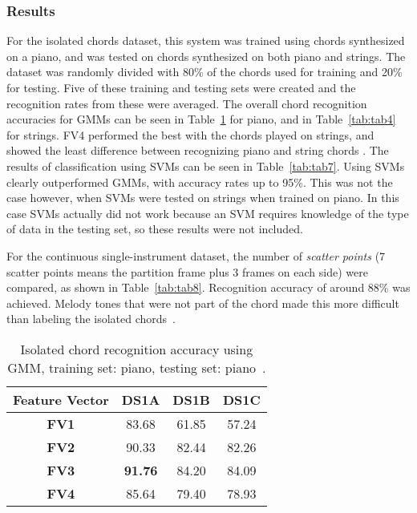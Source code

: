 \documentclass{sig-alternate}
\begin{document}
\subsubsection{Results}

For the isolated chords dataset, this system was trained using chords synthesized on a piano, and was tested on chords synthesized on both piano and strings. The dataset was randomly divided with 80\% of the chords used for training and 20\% for testing. Five of these training and testing sets were created and the recognition rates from these were averaged. The overall chord recognition accuracies for GMMs can be seen in Table~\ref{tab:tab3} for piano, and in Table~\ref{tab:tab4} for strings. FV4 performed the best with the chords played on strings, and showed the least difference between recognizing piano and string chords \cite{Morman:2006}. The results of classification using SVMs can be seen in Table~\ref{tab:tab7}. Using SVMs clearly outperformed GMMs, with accuracy rates up to 95\%. This was not the case however, when SVMs were tested on strings when trained on piano. In this case SVMs actually did not work because an SVM requires knowledge of the type of data in the testing set, so these results were not included.  

For the continuous single-instrument dataset, the number of \textit{scatter points} (7 scatter points means the partition frame plus 3 frames on each side) were compared, as shown in Table~\ref{tab:tab8}. Recognition accuracy of around 88\% was achieved. Melody tones that were not part of the chord made this more difficult than labeling the isolated chords~\cite{Morman:2006}. 



\begin{table}
\centering
\begin{tabular}{|c|c|c|c|} \hline
\textbf{Feature Vector} & \textbf{DS1A} & \textbf{DS1B} & \textbf{DS1C} \\ \hline
\textbf{FV1} & 83.68 & 61.85 & 57.24 \\ \hline
\textbf{FV2} & 90.33 & 82.44 & 82.26 \\ \hline
\textbf{FV3} & \textbf{91.76} & 84.20 & 84.09 \\ \hline
\textbf{FV4} & 85.64 & 79.40 & 78.93 \\ \hline
\end{tabular}
\caption{Isolated chord recognition accuracy using GMM, training set: piano, testing set: piano~\cite{Morman:2006}.}
\label{tab:tab3}
\end{table} 
\end{document}
